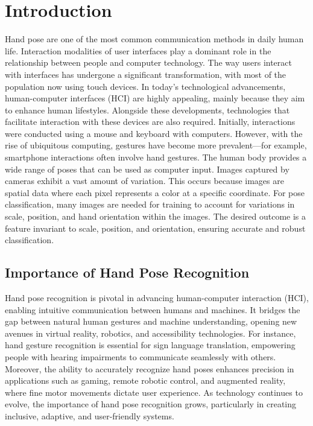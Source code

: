 \chapter{Introduction}

Hand pose are one of the most common communication methods in daily human life. Interaction modalities of user interfaces play a dominant role in the relationship between people and computer technology. The way users interact with interfaces has undergone a significant transformation, with most of the population now using touch devices. In today's technological advancements, human-computer interfaces (HCI) are highly appealing, mainly because they aim to enhance human lifestyles. Alongside these developments, technologies that facilitate interaction with these devices are also required. Initially, interactions were conducted using a mouse and keyboard with computers. However, with the rise of ubiquitous computing, gestures \cite{9427388} have become more prevalent—for example, smartphone interactions often involve hand gestures. The human body provides a wide range of poses that can be used as computer input. Images captured by cameras exhibit a vast amount of variation. This occurs because images are spatial data where each pixel represents a color at a specific coordinate. For pose classification, many images are needed for training to account for variations in scale, position, and hand orientation within the images. The desired outcome is a feature invariant to scale, position, and orientation, ensuring accurate and robust classification.

\section{Importance of Hand Pose Recognition}

Hand pose recognition is pivotal in advancing human-computer interaction (HCI), enabling intuitive communication between humans and machines. It bridges the gap between natural human gestures \cite{9609102} and machine understanding, opening new avenues in virtual reality, robotics, and accessibility technologies. For instance, hand gesture recognition is essential for sign language translation, empowering people with hearing impairments to communicate seamlessly with others. Moreover, the ability to accurately recognize hand poses enhances precision in applications such as gaming, remote robotic control, and augmented reality, where fine motor movements dictate user experience. As technology continues to evolve, the importance of hand pose recognition grows, particularly in creating inclusive, adaptive, and user-friendly systems.

